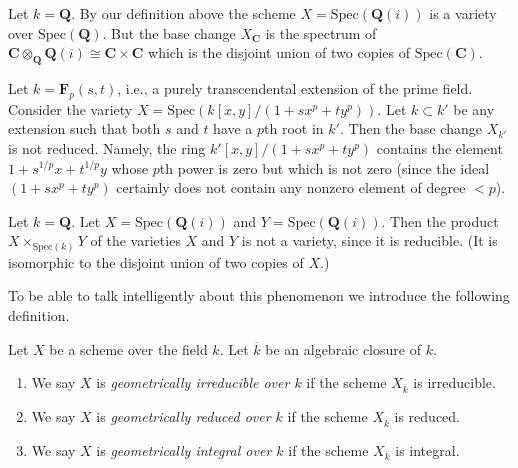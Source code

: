 \begin{example}
\label{example-not-geometrically-irreducible}
Let $k = \mathbf{Q}$. By our definition above the scheme
$X = \text{Spec}(\mathbf{Q}(i))$ is a variety over $\text{Spec}(\mathbf{Q})$.
But the base change $X_{\mathbf{C}}$ is the spectrum of
$\mathbf{C} \otimes_{\mathbf{Q}} \mathbf{Q}(i) \cong
\mathbf{C} \times \mathbf{C}$ which is the disjoint union of
two copies of $\text{Spec}(\mathbf{C})$.
\end{example}

\begin{example}
\label{example-not-geometrically-reduced}
Let $k = \mathbf{F}_p(s, t)$, i.e., a purely transcendental extension
of the prime field. Consider the variety
$X = \text{Spec}(k[x, y]/(1 + sx^p + ty^p))$.
Let $k \subset k'$ be any extension such that
both $s$ and $t$ have a $p$th root in $k'$.
Then the base change $X_{k'}$ is not reduced.
Namely, the ring $k'[x, y]/(1 + s x^p + ty^p)$ contains the element
$1 + s^{1/p}x + t^{1/p}y$ whose $p$th power is zero but
which is not zero (since the ideal $(1 + sx^p + ty^p)$ certainly
does not contain any nonzero element of degree $< p$).
\end{example}

\begin{example}
\label{example-product-not-a-variety}
Let $k = \mathbf{Q}$. Let $X = \text{Spec}(\mathbf{Q}(i))$
and $Y = \text{Spec}(\mathbf{Q}(i))$. Then the product
$X \times_{\text{Spec}(k)} Y$ of the varieties $X$ and $Y$
is not a variety, since it is reducible. (It is isomorphic
to the disjoint union of two copies of $X$.)
\end{example}

\noindent
To be able to talk intelligently about this phenomenon we introduce
the following definition.

\begin{definition}
\label{definition-geometrically-integral}
Let $X$ be a scheme over the field $k$.
Let $\overline{k}$ be an algebraic closure of $k$.
\begin{enumerate}
\item We say $X$ is {\it geometrically irreducible over $k$}
if the scheme $X_{\overline{k}}$ is irreducible.
\item We say $X$ is {\it geometrically reduced over $k$}
if the scheme $X_{\overline{k}}$ is reduced.
\item We say $X$ is {\it geometrically integral over $k$}
if the scheme $X_{\overline{k}}$ is integral.
\end{enumerate}
\end{definition}

